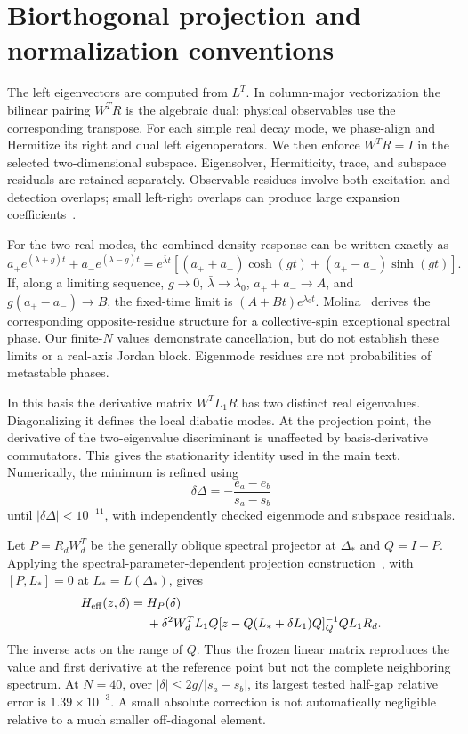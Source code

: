 \documentclass[aps,pra,10pt,onecolumn,superscriptaddress,amsmath,amssymb]{revtex4-2}
\begin{document}
\section{Biorthogonal projection and normalization conventions}
The left eigenvectors are computed from $L^T$. In column-major vectorization the bilinear pairing $W^TR$ is the algebraic dual; physical observables use the corresponding transpose. For each simple real decay mode, we phase-align and Hermitize its right and dual left eigenoperators. We then enforce $W^TR=I$ in the selected two-dimensional subspace. Eigensolver, Hermiticity, trace, and subspace residuals are retained separately. Observable residues involve both excitation and detection overlaps; small left-right overlaps can produce large expansion coefficients~\cite{MoriShirai2020}.

For the two real modes, the combined density response can be written exactly as
\begin{equation}
 a_+e^{(\bar\lambda+g)t}+a_-e^{(\bar\lambda-g)t}
 =e^{\bar\lambda t}\left[(a_++a_-)\cosh(gt)+(a_+-a_-)\sinh(gt)\right].
\end{equation}
If, along a limiting sequence, $g\to0$, $\bar\lambda\to\lambda_0$, $a_++a_-\to A$, and $g(a_+-a_-)\to B$, the fixed-time limit is $(A+Bt)e^{\lambda_0t}$. Molina~\cite{Molina2026} derives the corresponding opposite-residue structure for a collective-spin exceptional spectral phase. Our finite-$N$ values demonstrate cancellation, but do not establish these limits or a real-axis Jordan block. Eigenmode residues are not probabilities of metastable phases.

In this basis the derivative matrix $W^TL_1R$ has two distinct real eigenvalues. Diagonalizing it defines the local diabatic modes. At the projection point, the derivative of the two-eigenvalue discriminant is unaffected by basis-derivative commutators. This gives the stationarity identity used in the main text. Numerically, the minimum is refined using
\begin{equation}
 \delta\Delta=-\frac{e_a-e_b}{s_a-s_b}
\end{equation}
until $|\delta\Delta|<10^{-11}$, with independently checked eigenmode and subspace residuals.

Let $P=R_dW_d^T$ be the generally oblique spectral projector at $\Delta_*$ and $Q=I-P$. Applying the spectral-parameter-dependent projection construction~\cite{Feshbach1958,FSElimination2020}, with $[P,L_*]=0$ at $L_*=L(\Delta_*)$, gives
\begin{align}
 H_{\rm eff}(z,\delta)={}&H_P(\delta)\nonumber\\
 &+\delta^2 W_d^TL_1Q
 [z-Q(L_*+\delta L_1)Q]^{-1}_{Q}QL_1R_d.
 \label{eq:Qcorrection}
\end{align}
The inverse acts on the range of $Q$. Thus the frozen linear matrix reproduces the value and first derivative at the reference point but not the complete neighboring spectrum. At $N=40$, over $|\delta|\le2g/|s_a-s_b|$, its largest tested half-gap relative error is $1.39\times10^{-3}$. A small absolute correction is not automatically negligible relative to a much smaller off-diagonal element.
\end{document}
